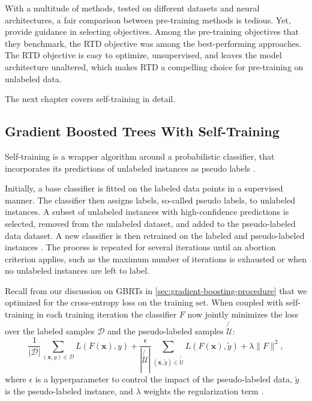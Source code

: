 With a multitude of methods, tested on different datasets and neural architectures, a fair comparison between pre-training methods is tedious. Yet, \textcite[][2-3]{rubachevRevisitingPretrainingObjectives2022} provide guidance in selecting objectives. Among the pre-training objectives that they benchmark, the \gls{RTD} objective was among the best-performing approaches. The \gls{RTD} objective is easy to optimize, unsupervised, and leaves the model architecture unaltered, which makes \gls{RTD} a compelling choice for pre-training on unlabeled data.

The next chapter covers self-training in detail.

\subsection{Gradient Boosted Trees With Self-Training}\label{sec:extensions-to-gradient-boosted-trees}

Self-training is a wrapper algorithm around a probabilistic classifier, that incorporates its predictions of unlabeled instances as pseudo labels \autocite[][190]{yarowskyUnsupervisedWordSense1995}.

Initially, a base classifier is fitted on the labeled data points in a supervised manner. The classifier then assigns labels, so-called pseudo labels, to unlabeled instances. A subset of unlabeled instances with high-confidence predictions is selected, removed from the unlabeled dataset, and added to the pseudo-labeled data dataset. A new classifier is then retrained on the labeled and pseudo-labeled instances \autocite[][190--192]{yarowskyUnsupervisedWordSense1995}. The process is repeated for several iterations until an abortion criterion applies, such as the maximum number of iterations is exhausted or when no unlabeled instances are left to label.

Recall from our discussion on \glspl{GBRT} in \cref{sec:gradient-boosting-procedure} that we optimized for the cross-entropy loss on the training set. When coupled with self-training in each training iteration the classifier $F$ now jointly minimizes the loss over the labeled samples $\mathcal{D}$ and the pseudo-labeled samples $\not{\mathcal{U}}$:
\begin{equation}
    \frac{1}{\left|\mathcal{D}\right|} \sum_{(\mathbf{x}, y) \in \mathcal{D}} L(F(\mathbf{x}), y)+\frac{\epsilon}{\left|\not{\mathcal{U}}\right|} \sum_{(\mathbf{x}, \tilde{y}) \in \not{\mathcal{U}}} L(F(\mathbf{x}), \tilde{y})+\lambda\|F\|^2,
\end{equation}
where $\epsilon$ is a hyperparameter to control the impact of the pseudo-labeled data, $\tilde{y}$ is the pseudo-labeled instance, and $\lambda$ weights the regularization term \autocite[][4]{aminiSelfTrainingSurvey2023}.

